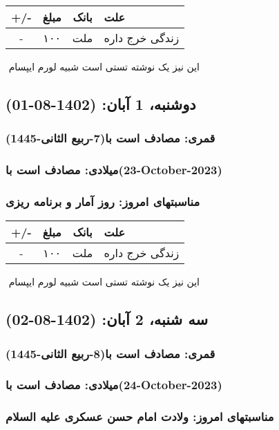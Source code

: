 \documentclass{article}
\newcommand{\rnote}[1]{\marginpar{\textcolor{color}{\StrSubstitute{\##1}{ }{\_}}}}
\newcommand{\myRow}[4]{
    #1 & #2 & #3 & #4 \\ \hline
}
\begin{document}
\begin{tabular}{ | c | c | c | p{5cm} |}
    \hline
    \myRow{ +/- }{مبلغ}{بانک}{علت}
    \myRow{-}{۱۰۰}{ملت}{زندگی خرج داره}
\end{tabular}
\newline
\newline

‌
\rnote{تست}
این نیز یک نوشته تستی است شبیه لورم ایپسام




\newpage
{}
\textcolor{color}{
\section{ دوشنبه، 1 آبان: (1402-08-01) }
\subsubsection*{قمری: مصادف است با(7-ربیع الثانی-1445)} 
\subsubsection*{میلادی: مصادف است با(23-October-2023)}
\subsubsection*{مناسبتهای امروز: روز آمار و برنامه ریزی}
}


\begin{tabular}{ | c | c | c | p{5cm} |}
    \hline
    \myRow{ +/- }{مبلغ}{بانک}{علت}
    \myRow{-}{۱۰۰}{ملت}{زندگی خرج داره}
\end{tabular}
\newline
\newline

‌
\rnote{تست}
این نیز یک نوشته تستی است شبیه لورم ایپسام




\newpage
{}
\textcolor{color}{
\section{ سه شنبه، 2 آبان: (1402-08-02) }
\subsubsection*{قمری: مصادف است با(8-ربیع الثانی-1445)} 
\subsubsection*{میلادی: مصادف است با(24-October-2023)}
\subsubsection*{مناسبتهای امروز: ولادت امام حسن عسکری علیه السلام}
}
\end{document}
